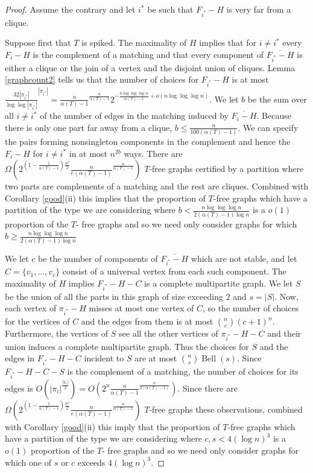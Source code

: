 \documentclass[12pt]{article}
\theoremstyle{definition}
\DeclareMathOperator{\Bell}{Bell}
\begin{document}
 \begin{proof}
 Assume the contrary and let  $i^*$   be  such that $F_{i^*}-H$ is  very far from a clique. 
 
 Suppose first  that  $T$ is spiked.  
 The maximality of $H$ implies that for $i \neq  {i^*}$    every $F_i-H$ is the complement of a matching
 and that every component of $\overline{F_{i^*}-H}$  is either a clique or the join of a vertex and the disjoint union of cliques. 
 Lemma \ref{graphcount2} tells us that the number of choices for $F_{i^*}-H$ is at most $\frac{32|\pi_{i^*}|}{\log \log |\pi_{i^*}|}^{|\pi_{i^*}|} =\frac{n}{\alpha(T)-1}^{\frac{n}{\alpha(T)-1}}2^{-\frac{n\log \log \log n}{\alpha(T)-1} +o(n \log \log \log n)}$.  We let $b$ 
  be the sum over all $i \neq {i^*}$ of the number of edges in the matching induced by $\overline{F_i-H}$. Because there is only one part far away from a clique,
 $b \le \frac{n}{100(\alpha(T)-1)}$.  We can specify the pairs  forming nonsingleton components in the complement and hence the $F_i-H$
 for $i \neq i^*$ in at most $n^{2b}$ ways. There are $\Omega(2^{(1-\frac{1}{\alpha(T)-1})\frac{n^2}{2}}\frac{n}{e(\alpha(T)-1)}^{\frac{n}{\alpha(T)-1}})$ $T$-free graphs 
 certified by a partition where two parts are complements of a matching  and the rest are cliques. 
 Combined with Corollary \ref{good}(ii) this implies  that the proportion of $T$-free graphs which have a partition of the type we are considering where $b<\frac{n \log \log \log n}{2(\alpha(T)-1)\log n}$ 
 is a $o(1)$ proportion of the $T$- free graphs and so we need only consider graphs for which $b \ge \frac{n \log \log \log n}{2(\alpha(T)-1)\log n}$ 
 
 We let  $c$ be the number of components of $\overline{F_{i^*}-H}$ which are not stable, and let $C=\{v_1,...,v_c\}$ 
 consist of a universal vertex from each such component.  The maximality of $H$ implies $F_{i^*}-H-C$ is a complete multipartite graph. 
 We let $S$ be the union of all the parts in this graph of size exceeding $2$ and $s=|S|$.  Now, each vertex of $\pi_{i^*}-H$ misses at most one vertex of 
 $C$, so the number of choices for the vertices of $C$ and the edges from them is at most ${n \choose c}(c+1)^n$. Furthermore, the vertices of 
 $S$ see all the other vertices of $\pi_{i^*}-H-C$ and their union induces a complete multipartite graph. Thus the choices for $S$ and the edges in $F_{i^*}-H-C$ incident
 to $S$ are at most ${n \choose s}\Bell(s)$. Since $F_{i^*}-H-C-S$ is the complement of a matching, the number of choices for its edges is 
 $O(|\pi_i|^{\frac{|\pi_i|}{2}})=O(2^n\frac{n}{\alpha(T)-1}^\frac{n}{2(\alpha(T)-1)})$. 
 Since there are $\Omega(2^{(1-\frac{1}{\alpha(T)-1})\frac{n^2}{2}}\frac{n}{e(\alpha(T)-1)}^{\frac{n}{\alpha(T)-1}})$ $T$-free graphs
 these observations, combined with Corollary \ref{good}(ii) this imply  that the proportion of $T$-free graphs which have a partition of the type we are considering where 
 $c,s <4(\log n)^3$ is a $o(1)$ proportion of the $T$- free graphs and so we need only consider graphs for which one of $s$ or $c$ 
 exceeds  $4(\log n)^3 $. 
 

\end{proof}
\end{document}
